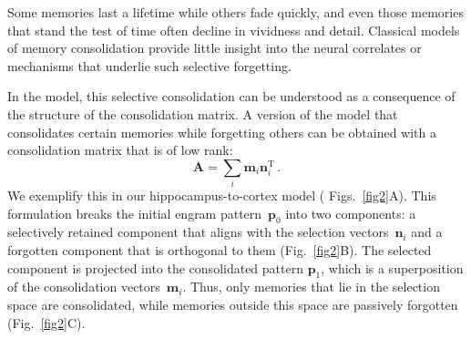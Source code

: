 Some memories last a lifetime while others fade quickly, and even those memories that stand the test of time often decline in vividness and detail. Classical models of memory consolidation provide little insight into the neural correlates or mechanisms that underlie such selective forgetting. %

In the model, this selective consolidation can be understood as a consequence of the structure of the consolidation matrix.  A version of the model that consolidates certain memories while forgetting others can be obtained with a consolidation matrix that is of low rank:
%
\begin{equation}\label{eq:low_rank}
\mathbf{A} = \sum_i \mathbf{m}_i \mathbf{n}_i^{\text{T}}\,.
\end{equation}
%
We exemplify this in our hippocampus-to-cortex model (%
Figs.~\ref{fig2}A). %
%
%
This formulation breaks the initial engram pattern~$\mathbf{p}_0$ into two components: a selectively retained component that aligns with the selection vectors~$\mathbf{n}_i$ and a forgotten component that is orthogonal to them (Fig.~\ref{fig2}B). The selected component is projected into the consolidated pattern $\mathbf{p}_1$, which is a superposition of the consolidation vectors~$\mathbf{m}_i$. %
Thus, only memories that lie in the selection space are consolidated, while memories outside this space are passively forgotten (Fig.~\ref{fig2}C).


